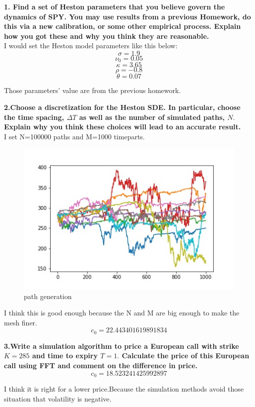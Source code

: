 \documentclass{winnower}
\begin{document}
\textbf{1. Find a set of Heston parameters that you believe govern the dynamics of SPY. You
may use results from a previous Homework, do this via a new calibration, or some other
empirical process. Explain how you got these and why you think they are reasonable.}
\\
I would set the Heston model parameters like this below:
$$\sigma=1.9$$
$$\nu_0=0.05$$
$$\kappa=3.65$$
$$\rho=-0.8$$
$$\theta=0.07$$

Those parameters' value are from the previous homework.

\newpage
\textbf{2.Choose a discretization for the Heston SDE. In particular, choose the time spacing,
$\Delta T$ as well as the number of simulated paths, $N .$ Explain why you think these choices will lead to an accurate result.}
\\

I set N=100000 paths and M=1000 timeparts.

\begin{figure}[!h]
\begin{center}
\includegraphics[scale=0.7]{1_1.jpg}
\caption
{path generation}
\label{fig:f1}
\end{center}
\end{figure}

I think this is good enough because the N and M are big enough to make the mesh finer.
$$c_0=22.443401619891834$$


\textbf{3.Write a simulation algorithm to price a European call with strike $K=285$ and time to expiry $T=1 .$ Calculate the price of this European call using FFT and comment on the difference in price.}
\\
$$c_0=18.523241425992897$$

I think it is right for a lower price.Because the simulation methods avoid those situation that volatility is negative.
\\
\end{document}
